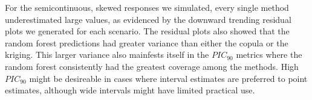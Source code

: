 \documentclass{article}
\begin{document}
For the semicontinuous, skewed responses we simulated, every single method underestimated large values, as evidenced by the downward trending residual plots we generated for each scenario.
The residual plots also showed that the random forest predictions had greater variance than either the copula or the kriging.
This larger variance also mainfests itself in the $PIC_{90}$ metrics where the random forest consistently had the greatest coverage among the methods.
High $PIC_{90}$ might be desireable in cases where interval estimates are preferred to point estimates, although wide intervals might have limited practical use.

%
\begin{singlespace}
\printbibliography
\end{singlespace}
\end{document}

